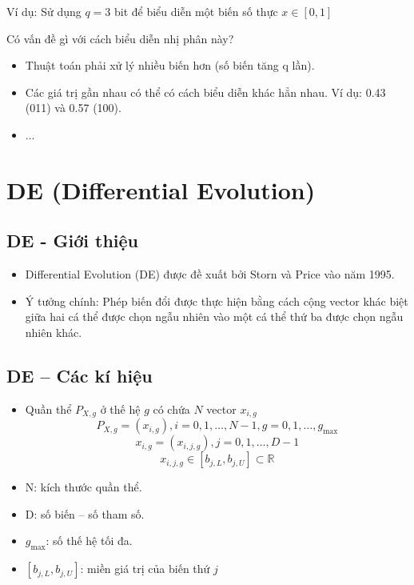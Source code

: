\documentclass{book}
\begin{document}
Ví dụ: Sử dụng $q=3$ bit để biểu diễn một biến số thực $x \in [0,1]$

\begin{center}
\end{center}

Có vấn đề gì với cách biểu diễn nhị phân này?

\begin{itemize}
    \item Thuật toán phải xử lý nhiều biến hơn (số biến tăng q lần).
    \item Các giá trị gần nhau có thể có cách biểu diễn khác hẳn nhau. Ví dụ: 0.43 (011) và 0.57 (100).
    \item ...
\end{itemize}

\chapter{DE (Differential Evolution)}

\section{DE - Giới thiệu}
\begin{itemize}
    \item Differential Evolution (DE) được đề xuất bởi Storn và Price vào năm 1995.
    \item Ý tưởng chính: Phép biến đổi được thực hiện bằng cách cộng vector khác biệt giữa hai cá thể được chọn ngẫu nhiên vào một cá thể thứ ba được chọn ngẫu nhiên khác.
\end{itemize}

\section{DE – Các kí hiệu}

\begin{itemize}
    \item Quần thể $P_{X,g}$ ở thế hệ $g$ có chứa $N$ vector $x_{i,g}$
    $$ P_{X,g} = (x_{i,g}), i = 0,1, \dots, N-1, g = 0,1, \dots, g_{\max} $$
    $$ x_{i,g} = (x_{i,j,g}), j = 0,1, \dots, D-1 $$
    $$ x_{i,j,g} \in [b_{j,L}, b_{j,U}] \subset \mathbb{R} $$
    \item N: kích thước quần thể.
    \item D: số biến – số tham số.
    \item $g_{\max}$: số thế hệ tối đa.
    \item $[b_{j,L}, b_{j,U}]$: miền giá trị của biến thứ $j$
\end{itemize}
\end{document}
